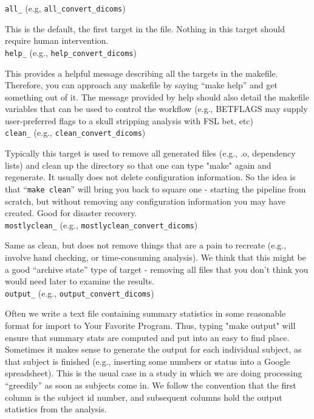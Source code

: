 \texttt{all_} (e.g, \texttt{all_convert_dicoms}) 

This is the default, the first target in the file. Nothing in this target should require human intervention.\\

\texttt{help_} (e.g., \texttt{help_convert_dicoms})

This provides a helpful message describing all the targets in the makefile. Therefore, you can approach any makefile by saying ``make help'' and get something out of it. The message provided by help should also detail the makefile variables that can be used to control the workflow (e.g., BETFLAGS may supply user-preferred flags to a skull stripping analysis with FSL bet, etc)\\

\texttt{clean_} (e.g., \texttt{clean_convert_dicoms})

Typically this target is used to remove all generated files (e.g., .o, dependency lists) and clean up the directory so that one can type "make" again and regenerate. It usually does not delete configuration information. So the idea is that ``\texttt{make clean}'' will bring you back to square one - starting the pipeline from scratch, but without removing any configuration information you may have created. Good for disaster recovery.\\

\texttt{mostlyclean_} (e.g., \texttt{mostlyclean_convert_dicoms})

Same as clean, but does not remove things that are a pain to recreate (e.g., involve hand checking, or time-consuming analysis). We think that this might be a good ``archive state'' type of target - removing all files that you don't think you would need later to examine the results.\\

\texttt{output_} (e.g., \texttt{output_convert_dicoms})

Often we write a text file containing summary statistics in some reasonable format for import to Your Favorite Program. Thus, typing "make output" will ensure that summary stats are computed and put into an easy to find place. Sometimes it makes sense to generate the output for each individual subject, as that subject is finished (e.g., inserting some numbers or status into a Google spreadsheet). This is the usual case in a study in which we are doing processing ``greedily'' as soon as subjects come in. We follow the convention that the first column is the subject id number, and subsequent columns hold the output statistics from the analysis.

